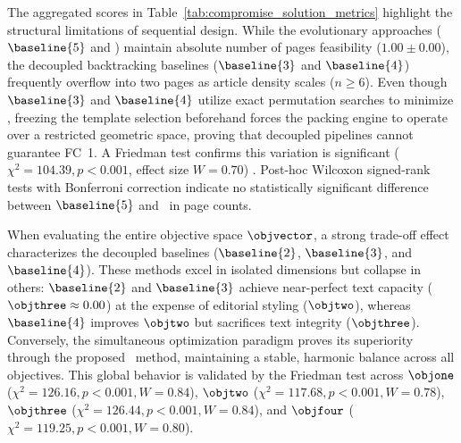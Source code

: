 \begin{table}[htbp]
\caption{Quantitative compromise-solution evaluation of methods across different article counts ($\numarticles$). Metrics express the $\text{mean} \pm \text{standard deviation}$ computed over all runs and instances in the corresponding stratum. Bold entries indicate the best-performing method within each complexity tier for each individual objective (all formulated as minimization targets). Green-shaded cells mark the three best-performing methods per objective and stratum. Red-shaded $N_{pages}$ cells flag configurations that exceed a single page. A dash (--) indicates that $\objtwo$ does not apply to $\baseline{5}$, since this objective is deactivated in this ablated baseline.}
\label{tab:compromise_solution_metrics}
\end{table}

The aggregated scores in Table~\ref{tab:compromise_solution_metrics} highlight the structural limitations of sequential design. While the evolutionary approaches ($\baseline{5}$ and \methodNameUniform) maintain absolute number of pages feasibility ($1.00 \pm 0.00$), the decoupled backtracking baselines ($\baseline{3}$ and $\baseline{4}$) frequently overflow into two pages as article density scales ($n \ge 6$). Even though $\baseline{3}$ and $\baseline{4}$ utilize exact permutation searches to minimize \objone, freezing the template selection beforehand forces the packing engine to operate over a restricted geometric space, proving that decoupled pipelines cannot guarantee FC~1. A Friedman test confirms this variation is significant ($\chi^2 = 104.39, p < 0.001$, effect size $W = 0.70$) . Post-hoc Wilcoxon signed-rank tests with Bonferroni correction indicate no statistically significant difference between $\baseline{5}$ and \methodNameUniform\ in page counts.

When evaluating the entire objective space $\objvector$, a strong trade-off effect characterizes the decoupled baselines ($\baseline{2}$, $\baseline{3}$, and $\baseline{4}$). These methods excel in isolated dimensions but collapse in others: $\baseline{2}$ and $\baseline{3}$ achieve near-perfect text capacity ($\objthree \approx 0.00$) at the expense of editorial styling ($\objtwo$), whereas $\baseline{4}$ improves $\objtwo$ but sacrifices text integrity ($\objthree$). 
Conversely, the simultaneous optimization paradigm proves its superiority through the proposed \methodNameUniform\ method, maintaining a stable, harmonic balance across all objectives.
This global behavior is validated by the Friedman test across $\objone$ ($\chi^2 = 126.16, p < 0.001, W = 0.84$), $\objtwo$ ($\chi^2 = 117.68, p < 0.001, W = 0.78$), $\objthree$ ($\chi^2 = 126.44, p < 0.001, W = 0.84$), and $\objfour$ ($\chi^2 = 119.25, p < 0.001, W = 0.80$). %



